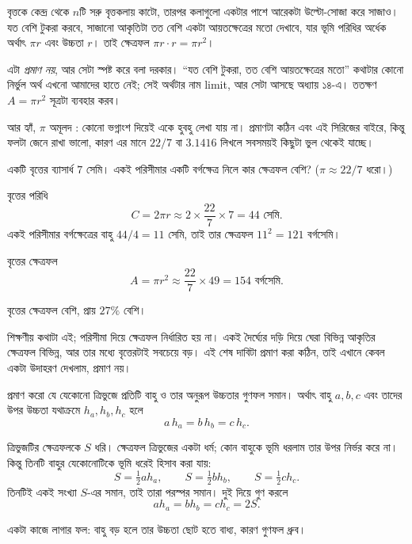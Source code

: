 \documentclass[11pt]{article}
\begin{document}
\begin{remark}
বৃত্তকে কেন্দ্র থেকে $n$টি সরু বৃত্তকলায় কাটো, তারপর কলাগুলো একটার পাশে আরেকটা
উল্টো-সোজা করে সাজাও। যত বেশি টুকরা করবে, সাজানো আকৃতিটা তত বেশি একটা
আয়তক্ষেত্রের মতো দেখাবে, যার ভূমি পরিধির অর্ধেক অর্থাৎ $\pi r$ এবং উচ্চতা $r$।
তাই ক্ষেত্রফল $\pi r \cdot r = \pi r^2$।

এটা \emph{প্রমাণ নয়}, আর সেটা স্পষ্ট করে বলা দরকার। ``যত বেশি টুকরা, তত বেশি
আয়তক্ষেত্রের মতো'' কথাটার কোনো নির্ভুল অর্থ এখনো আমাদের হাতে নেই; সেই অর্থটার
নাম limit, আর সেটা আসছে অধ্যায় ১৪-এ। ততক্ষণ $A = \pi r^2$ সূত্রটা ব্যবহার করব।

আর হ্যাঁ, $\pi$ অমূলদ : কোনো ভগ্নাংশ দিয়েই একে হুবহু লেখা যায় না। প্রমাণটা
কঠিন এবং এই সিরিজের বাইরে, কিন্তু ফলটা জেনে রাখা ভালো, কারণ এর মানে $22/7$ বা
$3.1416$ লিখলে সবসময়ই কিছুটা ভুল থেকেই যাচ্ছে।
\end{remark}

\begin{example}
একটি বৃত্তের ব্যাসার্ধ $7$ সেমি। একই পরিসীমার একটি বর্গক্ষেত্র নিলে কার ক্ষেত্রফল
বেশি? ($\pi \approx 22/7$ ধরো।)
\end{example}

\begin{solbox}
বৃত্তের পরিধি
\[
  C = 2\pi r \approx 2 \times \frac{22}{7} \times 7 = 44 \text{ সেমি}.
\]
একই পরিসীমার বর্গক্ষেত্রের বাহু $44/4 = 11$ সেমি, তাই তার ক্ষেত্রফল
$11^2 = 121$ বর্গসেমি।

বৃত্তের ক্ষেত্রফল
\[
  A = \pi r^2 \approx \frac{22}{7} \times 49 = 154 \text{ বর্গসেমি}.
\]

বৃত্তের ক্ষেত্রফল বেশি, প্রায় $27\%$ বেশি।

শিক্ষণীয় কথাটা এই; পরিসীমা দিয়ে ক্ষেত্রফল নির্ধারিত হয় না। একই দৈর্ঘ্যের
দড়ি দিয়ে ঘেরা বিভিন্ন আকৃতির ক্ষেত্রফল বিভিন্ন, আর তার মধ্যে বৃত্তেরটাই সবচেয়ে
বড়। এই শেষ দাবিটা প্রমাণ করা কঠিন, তাই এখানে কেবল একটা উদাহরণ দেখলাম, প্রমাণ নয়।
\end{solbox}

 প্রমাণ করো যে যেকোনো ত্রিভুজে প্রতিটি বাহু ও তার অনুরূপ উচ্চতার গুণফল
সমান। অর্থাৎ বাহু $a, b, c$ এবং তাদের উপর উচ্চতা যথাক্রমে $h_a, h_b, h_c$ হলে
\[
  a\,h_a = b\,h_b = c\,h_c .
\]

\begin{sol}
ত্রিভুজটির ক্ষেত্রফলকে $S$ ধরি। ক্ষেত্রফল ত্রিভুজের একটা ধর্ম; কোন বাহুকে
ভূমি ধরলাম তার উপর নির্ভর করে না। কিন্তু তিনটি বাহুর যেকোনোটিকে ভূমি ধরেই
হিসাব করা যায়:
\[
  S = \tfrac{1}{2} a h_a, \qquad S = \tfrac{1}{2} b h_b, \qquad
  S = \tfrac{1}{2} c h_c .
\]
তিনটিই একই সংখ্যা $S$-এর সমান, তাই তারা পরস্পর সমান। দুই দিয়ে গুণ করলে
\[
  a h_a = b h_b = c h_c = 2S .
\]

একটা কাজে লাগার ফল: বাহু বড় হলে তার উচ্চতা ছোট হতে বাধ্য, কারণ গুণফল ধ্রুব।
\end{sol}
\end{document}
